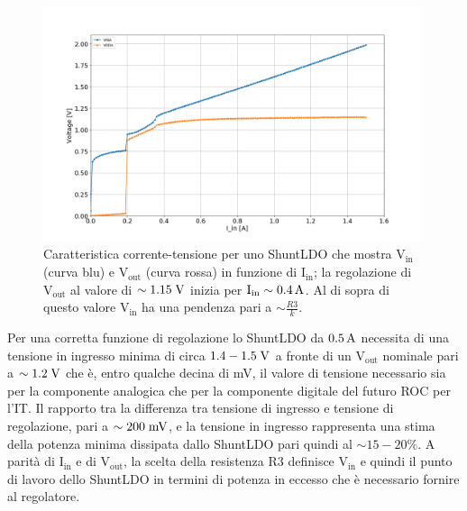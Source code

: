 \begin{figure}[!htbp]
\centering
\includegraphics[width=0.99\textwidth]{Immagini/CaratteristicaSLDO.png}
\caption{Caratteristica corrente-tensione per uno ShuntLDO che mostra $\mathrm{V_{in}}$ (curva blu) e $\mathrm{V_{out}}$ (curva rossa) in funzione di $\mathrm{I_{in}}$; la regolazione di  $\mathrm{V_{out}}$ al valore di $\sim 1.15\rm \; V$ inizia per $\mathrm{I_{in}}\sim0.4\rm \, A$. Al di sopra di questo valore $\mathrm{V_{in}}$ ha una pendenza pari a $\sim\frac{R3}{k}$.}
\label{fig:IVSLDO}
\end{figure}

Per una corretta funzione di regolazione lo ShuntLDO da $0.5\rm \, A$ necessita di una tensione in ingresso minima di circa $1.4-1.5\rm \; V$ a fronte di un $\mathrm{V_{out}}$ nominale pari a $\sim 1.2\rm \; V$ che \`e, entro qualche decina di mV, il valore di tensione necessario sia per la componente analogica che per la componente digitale del futuro ROC per l'IT. Il rapporto tra la differenza tra tensione di ingresso e tensione di regolazione, pari a $\sim 200\rm \; mV$, e la tensione in ingresso rappresenta una stima della potenza minima dissipata dallo ShuntLDO pari quindi al $\sim 15-20\%$. A parit\`a di $\mathrm{I_{in}}$ e di $\mathrm{V_{out}}$, la scelta della resistenza R3 definisce $\mathrm{V_{in}}$ e quindi il punto di lavoro dello ShuntLDO in termini di potenza in eccesso che \`e necessario fornire al regolatore.


